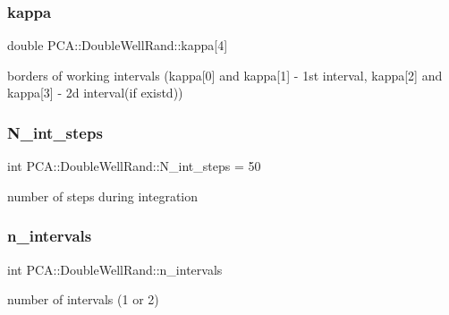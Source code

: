 \subsubsection{\texorpdfstring{kappa}{kappa}}
{\footnotesize\ttfamily double P\+C\+A\+::\+Double\+Well\+Rand\+::kappa\mbox{[}4\mbox{]}\hspace{0.3cm}{\ttfamily [private]}}



borders of working intervals (kappa\mbox{[}0\mbox{]} and kappa\mbox{[}1\mbox{]} -\/ 1st interval, kappa\mbox{[}2\mbox{]} and kappa\mbox{[}3\mbox{]} -\/ 2d interval(if existd)) 

\hypertarget{class_p_c_a_1_1_double_well_rand_a935058a518ed28d62b9e2285c30382dc}{}\label{class_p_c_a_1_1_double_well_rand_a935058a518ed28d62b9e2285c30382dc} 
\subsubsection{\texorpdfstring{N\+\_\+int\+\_\+steps}{N\_int\_steps}}
{\footnotesize\ttfamily int P\+C\+A\+::\+Double\+Well\+Rand\+::\+N\+\_\+int\+\_\+steps = 50\hspace{0.3cm}{\ttfamily [private]}}



number of steps during integration 

\hypertarget{class_p_c_a_1_1_double_well_rand_a89c48e652127b71600906d93f628dad5}{}\label{class_p_c_a_1_1_double_well_rand_a89c48e652127b71600906d93f628dad5} 
\subsubsection{\texorpdfstring{n\+\_\+intervals}{n\_intervals}}
{\footnotesize\ttfamily int P\+C\+A\+::\+Double\+Well\+Rand\+::n\+\_\+intervals\hspace{0.3cm}{\ttfamily [private]}}



number of intervals (1 or 2) 

\hypertarget{class_p_c_a_1_1_double_well_rand_ae53977982288d0b187a7fab536bbc55b}{}\label{class_p_c_a_1_1_double_well_rand_ae53977982288d0b187a7fab536bbc55b} 
